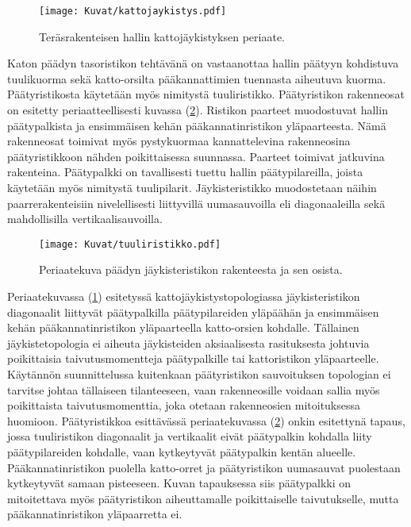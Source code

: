 \documentclass[12pt]{article}
\newenvironment{content}{\pagenumbering{arabic}}{}
\begin{document}
\begin{content}
\begin{figure}[htb]
\texttt{[image: Kuvat/kattojaykistys.pdf]}
\caption{Teräsrakenteisen hallin kattojäykistyksen periaate.}
\label{fig:kattojaykistys}
\end{figure}

Katon päädyn tasoristikon tehtävänä on vastaanottaa hallin päätyyn kohdistuva tuulikuorma sekä katto-orsilta pääkannattimien tuennasta aiheutuva kuorma. Päätyristikosta käytetään myös nimitystä tuuliristikko. Päätyristikon rakenneosat on esitetty periaatteellisesti kuvassa (\ref{fig:tuuliristikko}). Ristikon paarteet muodostuvat hallin päätypalkista ja ensimmäisen kehän pääkannatinristikon yläpaarteesta. Nämä rakenneosat toimivat myös pystykuormaa kannattelevina rakenneosina päätyristikkoon nähden poikittaisessa suunnassa. Paarteet toimivat jatkuvina rakenteina. Päätypalkki on tavallisesti tuettu hallin päätypilareilla, joista käytetään myös nimitystä tuulipilarit. Jäykisteristikko muodostetaan näihin paarrerakenteisiin nivelellisesti liittyvillä uumasauvoilla eli diagonaaleilla sekä mahdollisilla vertikaalisauvoilla. 

\begin{figure}[htb]
\texttt{[image: Kuvat/tuuliristikko.pdf]}
\caption{Periaatekuva päädyn jäykisteristikon rakenteesta ja sen osista.}
\label{fig:tuuliristikko}
\end{figure}

Periaatekuvassa (\ref{fig:kattojaykistys}) esitetyssä kattojäykistystopologiassa jäykisteristikon diagonaalit liittyvät päätypalkilla päätypilareiden yläpäähän ja ensimmäisen kehän pääkannatinristikon yläpaarteella katto-orsien kohdalle. Tällainen jäykistetopologia ei aiheuta jäykisteiden aksiaalisesta rasituksesta johtuvia poikittaisia taivutusmomentteja päätypalkille tai kattoristikon yläpaarteelle. Käytännön suunnittelussa kuitenkaan päätyristikon sauvoituksen topologian ei tarvitse johtaa tällaiseen tilanteeseen, vaan rakenneosille voidaan sallia myös poikittaista taivutusmomenttia, joka otetaan rakenneosien mitoituksessa huomioon. Päätyristikkoa esittävässä periaatekuvassa (\ref{fig:tuuliristikko}) onkin esitettynä tapaus, jossa tuuliristikon diagonaalit ja vertikaalit eivät päätypalkin kohdalla liity päätypilareiden kohdalle, vaan kytkeytyvät päätypalkin kentän alueelle. Pääkannatinristikon puolella katto-orret ja päätyristikon uumasauvat puolestaan kytkeytyvät samaan pisteeseen. Kuvan tapauksessa siis päätypalkki on mitoitettava myös päätyristikon aiheuttamalle poikittaiselle taivutukselle, mutta pääkannatinristikon yläpaarretta ei. 


\end{content}
\end{document}
